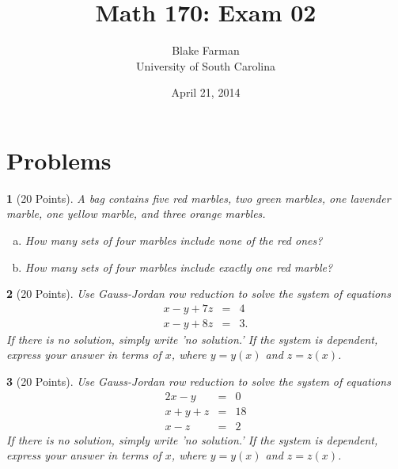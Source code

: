 \documentclass[12pt]{amsart}
\author{Blake Farman\\University of South Carolina}
\title{Math 170: Exam 02}
\date{April 21, 2014}
\begin{document}
\maketitle

\begin{center}
\end{center}

\vspace{0.2in}
\vspace{0.2in}

\theoremstyle{plain}
\newtheorem{thm}{}
\newtheorem{lem}{Lemma}
\theoremstyle{definition}
\newtheorem{defn}{Definition}

\section{Problems}

\begin{thm}[20 Points]\label{ex1}
  A bag contains five red marbles, two green marbles, one lavender marble, one yellow marble, and three orange marbles.
  \begin{enumerate}[(a)]
  \item
    How many sets of four marbles include none of the red ones?
    \vspace{2in}
  \item
    How many sets of four marbles include exactly one red marble?
    \vspace{2in}
  \end{enumerate}
\end{thm}

\newpage
\begin{thm}[20 Points]\label{ex2}
  Use Gauss-Jordan row reduction to solve the system of equations
  \begin{eqnarray*}
    x - y + 7z &=& 4\\
    x - y + 8z &=& 3.
  \end{eqnarray*}
  If there is no solution, simply write 'no solution.'  If the system is dependent, express your answer in terms of $x$, where $y = y(x)$ and $z = z(x)$.
  \vspace{2in}
\end{thm}

\begin{thm}[20 Points]\label{ex3}
  Use Gauss-Jordan row reduction to solve the system of equations
  \begin{eqnarray*}
    2x - y &=& 0\\
    x + y + z &=& 18\\
    x - z &=& 2
  \end{eqnarray*}
  If there is no solution, simply write 'no solution.'  If the system is dependent, express your answer in terms of $x$, where $y = y(x)$ and $z = z(x)$.
\end{thm}
\end{document}
